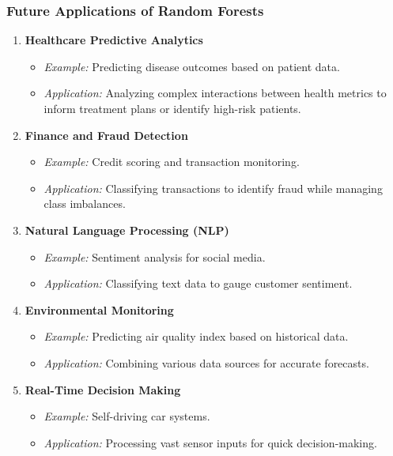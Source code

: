 \documentclass[aspectratio=169]{beamer}
\begin{document}
\begin{frame}[fragile]
    \frametitle{Future Applications of Random Forests}
    \begin{enumerate}
        \item \textbf{Healthcare Predictive Analytics}
        \begin{itemize}
            \item \textit{Example:} Predicting disease outcomes based on patient data.
            \item \textit{Application:} Analyzing complex interactions between health metrics to inform treatment plans or identify high-risk patients.
        \end{itemize}
        
        \item \textbf{Finance and Fraud Detection}
        \begin{itemize}
            \item \textit{Example:} Credit scoring and transaction monitoring.
            \item \textit{Application:} Classifying transactions to identify fraud while managing class imbalances.
        \end{itemize}

        \item \textbf{Natural Language Processing (NLP)}
        \begin{itemize}
            \item \textit{Example:} Sentiment analysis for social media.
            \item \textit{Application:} Classifying text data to gauge customer sentiment.
        \end{itemize}
        
        \item \textbf{Environmental Monitoring}
        \begin{itemize}
            \item \textit{Example:} Predicting air quality index based on historical data.
            \item \textit{Application:} Combining various data sources for accurate forecasts.
        \end{itemize}
        
        \item \textbf{Real-Time Decision Making}
        \begin{itemize}
            \item \textit{Example:} Self-driving car systems.
            \item \textit{Application:} Processing vast sensor inputs for quick decision-making.
        \end{itemize}
    \end{enumerate}
\end{frame}
\end{document}
